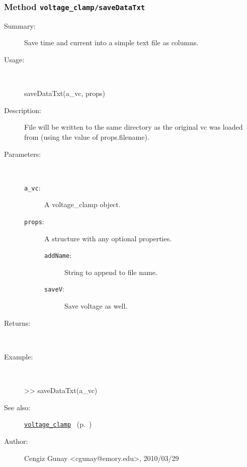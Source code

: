 \subsubsection[Method \texttt{saveDataTxt}]{Method \texttt{voltage\_clamp/saveDataTxt}}%
%
\label{ref_voltage_clamp__saveDataTxt}%
\hypertarget{ref_voltage_clamp__saveDataTxt}{}%
\begin{description}
\item[Summary:]Save time and current into a simple text file as columns.
%
\item[Usage:]~%
\begin{lyxcode}%
saveDataTxt(a\_vc, props)
%
\end{lyxcode}%
%
\item[Description:]%
File will be written to the same directory as the original vc was
 loaded from (using the value of props.filename).
\item[Parameters:]~
\begin{description}%
\item[\texttt{a\_vc}:]
 A voltage\_clamp object.
\item[\texttt{props}:]
 A structure with any optional properties.
\begin{description}%
\item[\texttt{addName}:]
 String to append to file name.
\item[\texttt{saveV}:]
 Save voltage as well.
\end{description}%
\end{description}%
%
\item[Returns:
]~

%
\item[Example:]~
\begin{lyxcode} >> saveDataTxt(a\_vc)
\\%
\end{lyxcode}
%
\item[See also:]%
\hyperlink{ref_voltage_clamp}{\texttt{voltage\_clamp}}%
\ (p.~\pageref{ref_voltage_clamp})%
%
%
\item[Author:]%
Cengiz Gunay <cgunay@emory.edu>, 2010/03/29
%
\end{description}
\methodline%
